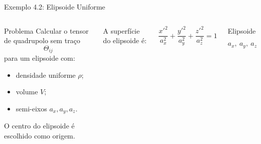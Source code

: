 \documentclass[aspectratio=169]{beamer}
\begin{document}
\begin{frame}{Exemplo 4.2: Elipsoide Uniforme}

\begin{columns}[T]


\small

\begin{mybox}{Problema}
Calcular o tensor de quadrupolo sem traço
\[
\Theta_{ij}
\]
para um elipsoide com:

\begin{itemize}
\item densidade uniforme \(\rho\);
\item volume \(V\);
\item semi-eixos \(a_x,a_y,a_z\).
\end{itemize}

O centro do elipsoide é escolhido como origem.
\end{mybox}


\small

A superfície do elipsoide é:

\begin{eqbox}
\begin{equation}
\frac{x'^2}{a_x^2}
+
\frac{y'^2}{a_y^2}
+
\frac{z'^2}{a_z^2}
=
1
\tag{4.71}
\end{equation}
\end{eqbox}

\vspace{0.4cm}

\begin{center}

\Large
Elipsoide

\vspace{0.2cm}

\[
a_x,\ a_y,\ a_z
\]

\end{center}

\end{columns}

\end{frame}
\end{document}
